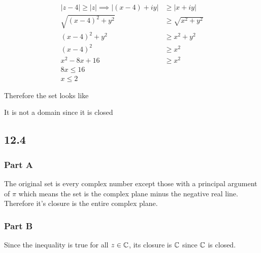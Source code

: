 \documentclass[12pt,titlepage]{extarticle}
\begin{document}
\begin{align*}
    |z-4| \geq |z| \implies |(x-4) + iy| &\geq |x + iy| \\
    \sqrt{(x-4)^2 + y^2} &\geq \sqrt{x^2 + y^2} \\
    (x-4)^2 + y^2 &\geq x^2 + y^2 \\
    (x-4)^2 &\geq x^2 \\
    x^2 - 8x + 16 &\geq x^2 \\
    8x \leq 16 \\
    x \leq 2
\end{align*}

Therefore the set looks like

\begin{center}
\end{center}

It is not a domain since it is closed

\subsection*{12.4}
\subsubsection*{Part A}
The original set is every complex number except those with a principal argument of $\pi$ which means the set is the complex plane minus the negative real line. Therefore it's closure is the entire complex plane.

\begin{center}
\end{center}

\subsubsection*{Part B}
Since the inequality is true for all $z \in \mathbb{C}$, its closure is $\mathbb{C}$ since $\mathbb{C}$ is closed.
\end{document}
